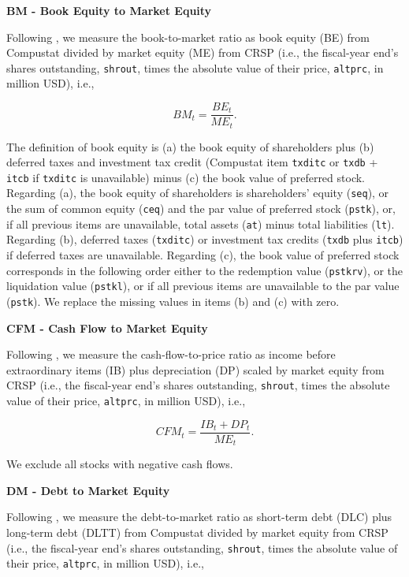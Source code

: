 \documentclass[
  article]{jss}
\begin{document}
\textbf{BM - Book Equity to Market Equity}

Following \citet{davis.2000}, we measure the book-to-market ratio as
book equity (BE) from Compustat divided by market equity (ME) from CRSP
(i.e., the fiscal-year end's shares outstanding, \texttt{shrout}, times
the absolute value of their price, \texttt{altprc}, in million USD),
i.e.,

\[
BM_{t} = \frac{BE_{t}}{ME_{t}}\text{.}
\]

The definition of book equity is (a) the book equity of shareholders
plus (b) deferred taxes and investment tax credit (Compustat item
\texttt{txditc} or \texttt{txdb} + \texttt{itcb} if \texttt{txditc} is
unavailable) minus (c) the book value of preferred stock. Regarding (a),
the book equity of shareholders is shareholders' equity (\texttt{seq}),
or the sum of common equity (\texttt{ceq}) and the par value of
preferred stock (\texttt{pstk}), or, if all previous items are
unavailable, total assets (\texttt{at}) minus total liabilities
(\texttt{lt}). Regarding (b), deferred taxes (\texttt{txditc}) or
investment tax credits (\texttt{txdb} plus \texttt{itcb}) if deferred
taxes are unavailable. Regarding (c), the book value of preferred stock
corresponds in the following order either to the redemption value
(\texttt{pstkrv}), or the liquidation value (\texttt{pstkl}), or if all
previous items are unavailable to the par value (\texttt{pstk}). We
replace the missing values in items (b) and (c) with zero.

\textbf{CFM - Cash Flow to Market Equity}

Following \citet{lakonishok.1994}, we measure the cash-flow-to-price
ratio as income before extraordinary items (IB) plus depreciation (DP)
scaled by market equity from CRSP (i.e., the fiscal-year end's shares
outstanding, \texttt{shrout}, times the absolute value of their price,
\texttt{altprc}, in million USD), i.e.,

\[
CFM_{t} = \frac{IB_{t} + DP_{t}}{ME_{t}}\text{.}
\]

We exclude all stocks with negative cash flows.

\textbf{DM - Debt to Market Equity}

Following \citet{bhandari.1988}, we measure the debt-to-market ratio as
short-term debt (DLC) plus long-term debt (DLTT) from Compustat divided
by market equity from CRSP (i.e., the fiscal-year end's shares
outstanding, \texttt{shrout}, times the absolute value of their price,
\texttt{altprc}, in million USD), i.e.,
\end{document}
